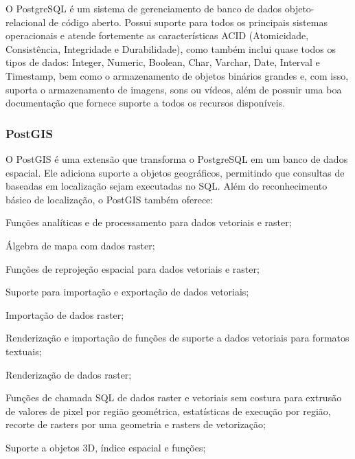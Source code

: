 {{{{{{{O PostgreSQL é um sistema de gerenciamento de banco de dados objeto-relacional de código aberto. Possui suporte para todos os principais sistemas operacionais e atende fortemente as características ACID (Atomicidade, Consistência, Integridade e Durabilidade), como também inclui quase todos os tipos de dados: Integer, Numeric, Boolean, Char, Varchar, Date, Interval e Timestamp, bem como o armazenamento de objetos binários grandes e, com isso, suporta o armazenamento de imagens, sons ou vídeos, além de possuir uma boa documentação que fornece suporte a todos os recursos disponíveis.

\subsubsection{PostGIS}

O PostGIS é uma extensão que transforma o PostgreSQL em um banco de dados espacial. Ele adiciona suporte a objetos geográficos, permitindo que consultas de baseadas em localização sejam executadas no SQL. Além do reconhecimento básico de localização, o PostGIS também oferece:

\begin{lista}
\item Funções analíticas e de processamento para dados vetoriais e raster;

\item Álgebra de mapa com dados raster;

\item Funções de reprojeção espacial para dados vetoriais e raster;

\item Suporte para importação e exportação de dados vetoriais;

\item Importação de dados raster;

\item Renderização e importação de funções de suporte a dados vetoriais para formatos textuais;

\item Renderização de dados raster;

\item Funções de chamada SQL de dados raster e vetoriais sem costura para extrusão de valores de pixel por região geométrica, estatísticas de execução por região, recorte de rasters por uma geometria e rasters de vetorização;

\item Suporte a objetos 3D, índice espacial e funções;


\end{lista}}}}}}}}
